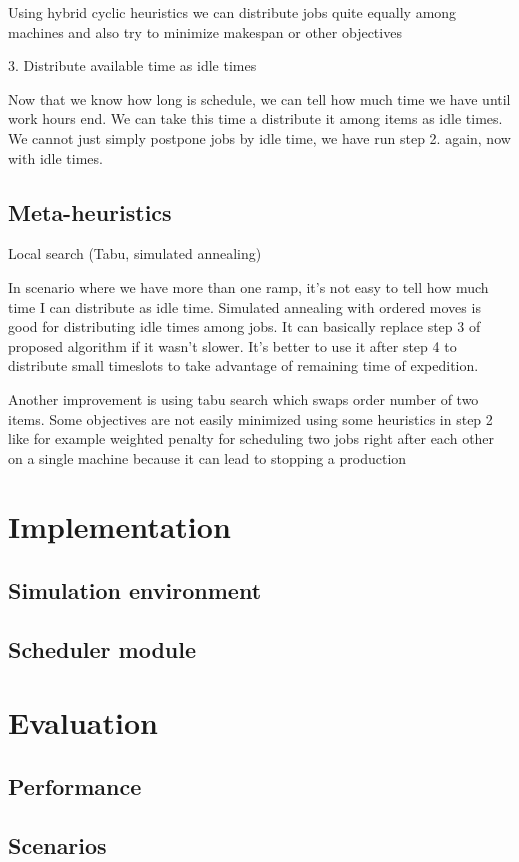 \documentclass{ctuthesis}
\begin{document}
Using hybrid cyclic heuristics we can distribute jobs quite equally among machines and also try to minimize makespan or other objectives

3. Distribute available time as idle times

Now that we know how long is schedule, we can tell how much time we have until work hours end. We can take this time a distribute it among items as idle times. We cannot just simply postpone jobs by idle time, we have run step 2. again, now with idle times.

\section{Meta-heuristics}
Local search (Tabu, simulated annealing)

In scenario where we have more than one ramp, it's not easy to tell how much time I can distribute as idle time. Simulated annealing with ordered moves is good for distributing idle times among jobs. It can basically replace step 3 of proposed algorithm if it wasn't slower. It's better to use it after step 4 to distribute small timeslots to take advantage of remaining time of expedition.

Another improvement is using tabu search which swaps order number of two items. Some objectives are not easily minimized using some heuristics in step 2 like for example weighted penalty for scheduling two jobs right after each other on a single machine because it can lead to stopping a production

\chapter{Implementation}
\section{Simulation environment}
\section{Scheduler module}
\chapter{Evaluation}
\label{ch:Evaluation}
\section{Performance}
\section{Scenarios}
\end{document}
